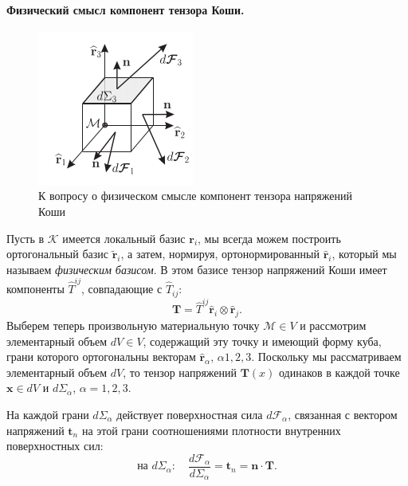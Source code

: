 \paragraph{Физический смысл компонент тензора Коши.}


\begin{figure}
	\centering
	\includegraphics[width=0.7\linewidth]{img/que18_2}
	\caption{К вопросу о физическом смысле компонент тензора напряжений Коши}
	\label{fig:que18_2}
\end{figure}

Пусть в $\mathcal{K}$ имеется локальный базис $\mathbf{r}_i$, мы всегда можем построить ортогональный базис $\widetilde{\mathbf{r}}_i$, а затем, нормируя, ортонормированный $\widehat{\mathbf{r}}_i$, который мы называем \textit{физическим базисом}. В этом базисе тензор напряжений Коши имеет компоненты $\widehat{T}^{ij}$, совпадающие с $\widehat{T}_{ij}$: 
\begin{equation*}
	\mathbf{T} = \widehat{T}^{i j} \widehat{\mathbf{r}}_i \otimes \widehat{\mathbf{r}}_j.
\end{equation*}
Выберем теперь произвольную материальную точку $\mathcal{M} \in V$ и рассмотрим элементарный объем $dV \in V$, содержащий эту точку и имеющий форму куба, грани которого ортогональны векторам $\widehat{\mathbf{r}}_{\alpha}, \, \alpha 1, 2, 3$. Поскольку мы рассматриваем элементарный объем $dV$, то тензор напряжений $\mathbf{T}(x)$ одинаков в каждой точке $\mathbf{x} \in dV$ и $d\Sigma_{\alpha}$, $\alpha = 1, 2, 3$. 

На каждой грани $d\Sigma_{\alpha}$ действует поверхностная сила $d\mathcal{F}_{\alpha}$, связанная с вектором напряжений $\mathbf{t}_{n}$ на этой грани соотношениями плотности внутренних поверхностных сил:
\begin{equation*}
	\text{на } d\Sigma_{\alpha}: \quad \frac{d \mathcal{F}_{\alpha}}{d \Sigma_{\alpha}} = \mathbf{t}_n = \mathbf{n} \cdot \mathbf{T}.
\end{equation*}

